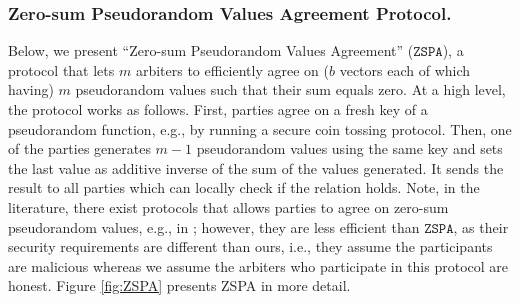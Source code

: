 
\subsubsection{Zero-sum Pseudorandom Values Agreement Protocol.}

Below, we present ``Zero-sum Pseudorandom Values Agreement'' ($\mathtt{ZSPA}$), a protocol that lets $m$ arbiters  to efficiently agree on ($b$ vectors each of which having) $m$ pseudorandom values such that their sum equals zero. At a high level, the protocol works as follows. First, parties agree on a fresh key  of a pseudorandom function, e.g., by running a secure coin tossing protocol. Then, one of the parties generates $m-1$ pseudorandom values using the same key and sets the last value as additive inverse of the sum of the values generated. It sends the result to all parties which can locally check if the relation holds. Note, in the literature,   there exist protocols that allows parties to agree on zero-sum pseudorandom values, e.g., in \cite{}; however, they are less efficient than $\mathtt{ZSPA}$, as their security requirements are different than ours, i.e., they assume the participants are malicious whereas we assume the arbiters who participate in this protocol  are honest. Figure \ref{fig:ZSPA} presents ZSPA in more detail. 


%
%
%



